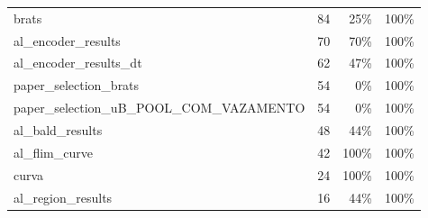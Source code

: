 \begin{tabular}{lrrr}
brats & 84 & 25\% & 100\% \\
al\_encoder\_results & 70 & 70\% & 100\% \\
al\_encoder\_results\_dt & 62 & 47\% & 100\% \\
paper\_selection\_brats & 54 & 0\% & 100\% \\
paper\_selection\_uB\_POOL\_COM\_VAZAMENTO & 54 & 0\% & 100\% \\
al\_bald\_results & 48 & 44\% & 100\% \\
al\_flim\_curve & 42 & 100\% & 100\% \\
curva & 24 & 100\% & 100\% \\
al\_region\_results & 16 & 44\% & 100\% \\
\bottomrule
\end{tabular}
